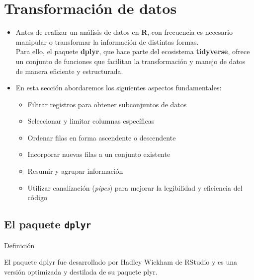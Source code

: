 \documentclass[
]{book}
\providecommand{\tightlist}{%
  \setlength{\itemsep}{0pt}\setlength{\parskip}{0pt}}
\begin{document}
\section{Transformación de datos}\label{transformaciuxf3n-de-datos}

\begin{itemize}
\item
  Antes de realizar un análisis de datos en \textbf{R}, con frecuencia es necesario manipular o transformar la información de distintas formas.\\
  Para ello, el paquete \textbf{dplyr}, que hace parte del ecosistema \textbf{tidyverse}, ofrece un conjunto de funciones que facilitan la transformación y manejo de datos de manera eficiente y estructurada.
\item
  En esta sección abordaremos los siguientes aspectos fundamentales:

  \begin{itemize}
  \tightlist
  \item
    Filtrar registros para obtener subconjuntos de datos\\
  \item
    Seleccionar y limitar columnas específicas\\
  \item
    Ordenar filas en forma ascendente o descendente\\
  \item
    Incorporar nuevas filas a un conjunto existente\\
  \item
    Resumir y agrupar información\\
  \item
    Utilizar canalización (\emph{pipes}) para mejorar la legibilidad y eficiencia del código
  \end{itemize}
\end{itemize}

\subsection{\texorpdfstring{El paquete \texttt{dplyr}}{El paquete dplyr}}\label{el-paquete-dplyr}

{} Definición

El paquete dplyr fue desarrollado por Hadley Wickham de RStudio y es una versión optimizada y destilada de su paquete plyr.
\end{document}
